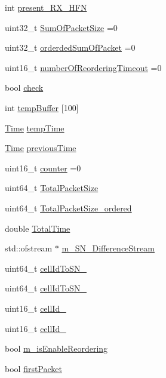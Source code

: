 \begin{DoxyCompactItemize}
\item 
int \hyperlink{classns3_1_1McUePdcp_a994b45ad9bc4a84147d8ba3bc2350941}{present\+\_\+\+R\+X\+\_\+\+H\+FN}
\item 
uint32\+\_\+t \hyperlink{classns3_1_1McUePdcp_aa92d2c898262670a1c474254130e2f8a}{Sum\+Of\+Packet\+Size} =0
\item 
uint32\+\_\+t \hyperlink{classns3_1_1McUePdcp_a1da60410561fa64f53e7d6ea141dab5d}{orderded\+Sum\+Of\+Packet} =0
\item 
uint16\+\_\+t \hyperlink{classns3_1_1McUePdcp_a2e69b1e65eeb264dc3c341311bfc4226}{number\+Of\+Reordering\+Timeout} =0
\item 
bool \hyperlink{classns3_1_1McUePdcp_a784e8ee9fba6625f044483432106d549}{check}
\item 
int \hyperlink{classns3_1_1McUePdcp_aa98b2c4b78dc44357d7061e9e6daaa7a}{temp\+Buffer} \mbox{[}100\mbox{]}
\item 
\hyperlink{classns3_1_1Time}{Time} \hyperlink{classns3_1_1McUePdcp_a00eedb0b6b12304981937ffd8f153f1c}{temp\+Time}
\item 
\hyperlink{classns3_1_1Time}{Time} \hyperlink{classns3_1_1McUePdcp_aceebe604ff06e04157f6151983568b70}{previous\+Time}
\item 
uint16\+\_\+t \hyperlink{classns3_1_1McUePdcp_a88274d4a8e6d37984572fb1bad313fe2}{counter} =0
\item 
uint64\+\_\+t \hyperlink{classns3_1_1McUePdcp_a5fe66d567481a6564a7d889cdf49da00}{Total\+Packet\+Size}
\item 
uint64\+\_\+t \hyperlink{classns3_1_1McUePdcp_a170d7342cb9d9fe7d213ae4a8d946d9c}{Total\+Packet\+Size\+\_\+ordered}
\item 
double \hyperlink{classns3_1_1McUePdcp_a490ce73b120d8f2b876182f4390f554a}{Total\+Time}
\item 
std\+::ofstream $\ast$ \hyperlink{classns3_1_1McUePdcp_a36a78a83ed664f5672d3fede9b7e635d}{m\+\_\+\+S\+N\+\_\+\+Difference\+Stream}
\item 
uint64\+\_\+t \hyperlink{classns3_1_1McUePdcp_a6652bd86f19945917828678ad5c16ce6}{cell\+Id\+To\+S\+N\+\_}
\item 
uint64\+\_\+t \hyperlink{classns3_1_1McUePdcp_adfc3763b73d7e877edb931bbf382c441}{cell\+Id\+To\+S\+N\+\_}
\item 
uint16\+\_\+t \hyperlink{classns3_1_1McUePdcp_a75f81f47aaf042ea0931e362b9b7592d}{cell\+Id\+\_}
\item 
uint16\+\_\+t \hyperlink{classns3_1_1McUePdcp_a87c04f1c791342fcd9c0dcadf7c6c563}{cell\+Id\+\_}
\item 
bool \hyperlink{classns3_1_1McUePdcp_aefa3008f536096e0d54de71d6596eb90}{m\+\_\+is\+Enable\+Reordering}
\item 
bool \hyperlink{classns3_1_1McUePdcp_a3104c310714ad1057de6591d73362ff7}{first\+Packet}
\end{DoxyCompactItemize}

